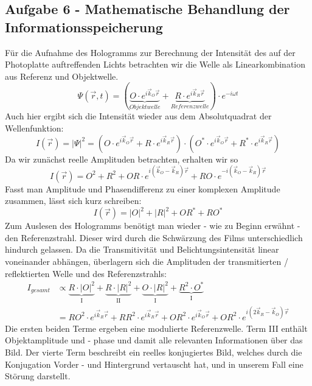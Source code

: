 \subsection*{Aufgabe 6 - Mathematische Behandlung der Informationsspeicherung}
Für die Aufnahme des Hologramms zur Berechnung der Intensität des auf der Photoplatte auftreffenden Lichts betrachten wir die Welle als Linearkombination aus Referenz und Objektwelle.
\begin{equation}
	\Psi(\vec{r},t) = (\underbrace{O\cdot e^{i\vec{k}_O\vec{r}}}_{Objektwelle} + \underbrace{R\cdot e^{i\vec{k}_R\vec{r}}}_{Referenzwelle})\cdot e^{-i\omega t}
\end{equation}
Auch hier ergibt sich die Intensität wieder aus dem Absolutquadrat der Wellenfunktion:
\begin{equation}
	I(\vec{r}) = \left| \Psi \right|^2 = (O\cdot e^{i\vec{k}_O\vec{r}} + R\cdot e^{i\vec{k}_R\vec{r}})\cdot (O^*\cdot e^{i\vec{k}_O\vec{r}} + R^*\cdot e^{i\vec{k}_R\vec{r}})
\end{equation}
Da wir zunächst reelle Amplituden betrachten, erhalten wir so
\begin{equation}
	I(\vec{r}) = O^2 + R^2 + OR\cdot e^{i(\vec{k}_O -\vec{k}_R)\vec{r}} + RO \cdot e^{-i(\vec{k}_O -\vec{k}_R)\vec{r}}
\end{equation}
Fasst man Amplitude und Phasendifferenz zu einer komplexen Amplitude zusammen, lässt sich kurz schreiben:
\begin{equation}
	I(\vec{r}) = \left| O \right|^2 + \left| R \right|^2 + OR^* + RO^*
\end{equation}
Zum Auslesen des Hologramms benötigt man wieder - wie zu Beginn erwähnt - den Referenzstrahl. Dieser wird durch die Schwärzung des Films unterschiedlich hindurch gelassen. Da die Transmitivität und Belichtungsintensität linear voneinander abhängen,  überlagern sich die Amplituden der transmitierten / reflektierten Welle und des Referenzstrahls:
\begin{align}
	I_{gesamt} &\propto \underbrace{R \cdot \left| O \right|^2}_{\text{I}} + \underbrace{R \cdot \left| R \right|^2}_{\text{II}} + \underbrace{O \cdot \left| R \right|^2}_{\text{I}} + \underbrace{R^2 \cdot O^*}_{\text{I}}\\
	&= RO^2\cdot e^{i\vec{k}_R\vec{r}} + RR^2\cdot e^{i\vec{k}_R\vec{r}} + OR^2\cdot e^{i\vec{k}_O\vec{r}} + OR^2\cdot e^{i(2\vec{k}_R - \vec{k}_O)\vec{r}}
\end{align}
Die ersten beiden Terme ergeben eine modulierte Referenzwelle. Term III enthält Objektamplitude und - phase und damit alle relevanten Informationen über das Bild. Der vierte Term beschreibt ein reelles konjugiertes Bild, welches durch die Konjugation Vorder - und Hintergrund vertauscht hat, und in unserem Fall eine Störung darstellt.
